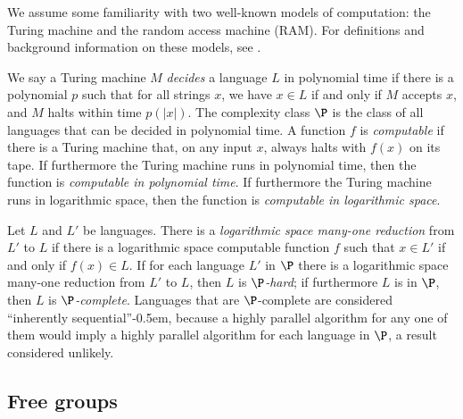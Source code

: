 \documentclass{elsarticlenonatbib}
\begin{document}
We assume some familiarity with two well-known models of computation: the Turing machine and the random access machine (RAM).
For definitions and background information on these models, see \autocite{savage98}.

We say a Turing machine $M$ \emph{decides} a language $L$ in polynomial time if there is a polynomial $p$ such that for all strings $x$, we have $x \in L$ if and only if $M$ accepts $x$, and $M$ halts within time $p(|x|)$.
The complexity class $\P$ is the class of all languages that can be decided in polynomial time.
A function $f$ is \emph{computable} if there is a Turing machine that, on any input $x$, always halts with $f(x)$ on its tape.
If furthermore the Turing machine runs in polynomial time, then the function is \emph{computable in polynomial time}.
If furthermore the Turing machine runs in logarithmic space, then the function is \emph{computable in logarithmic space}.

Let $L$ and $L'$ be languages.
There is a \emph{logarithmic space many-one reduction} from $L'$ to $L$ if there is a logarithmic space computable function $f$ such that $x \in L'$ if and only if $f(x) \in L$.
If for each language $L'$ in $\P$ there is a logarithmic space many-one reduction from $L'$ to $L$, then $L$ is \emph{$\P$-hard}; if furthermore $L$ is in $\P$, then $L$ is \emph{$\P$-complete}.
Languages that are $\P$-complete are considered ``inherently sequential''\kern-0.5em, because a highly parallel algorithm for any one of them would imply a highly parallel algorithm for each language in $\P$, a result considered unlikely.

\subsection{Free groups}
\end{document}
